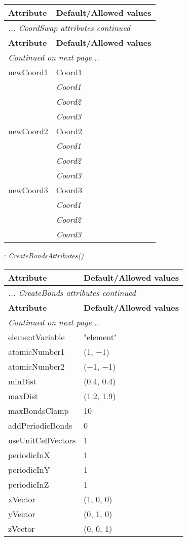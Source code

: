 \documentclass[10pt,a4paper]{report}
\begin{document}
\begin{longtable}{ll}
{\bf Attribute} & {\bf Default/Allowed values} \\
\hline \hline
\endfirsthead
\multicolumn{2}{l}{{\it ... CoordSwap attributes continued}} \\
{\bf Attribute} & {\bf Default/Allowed values} \\
\hline \hline
\endhead
\hline
\multicolumn{2}{l}{{\it Continued on next page...}} \\
\endfoot
\hline
\endlastfoot

newCoord1  &  Coord1   \\
 & {\it  Coord1} \\
 & {\it  Coord2} \\
 & {\it  Coord3} \\
newCoord2  &  Coord2   \\
 & {\it  Coord1} \\
 & {\it  Coord2} \\
 & {\it  Coord3} \\
newCoord3  &  Coord3   \\
 & {\it  Coord1} \\
 & {\it  Coord2} \\
 & {\it  Coord3} \\
\end{longtable}

\newpage

{}
: {\it CreateBondsAttributes() }\\[-3mm]

\begin{longtable}{ll}
{\bf Attribute} & {\bf Default/Allowed values} \\
\hline \hline
\endfirsthead
\multicolumn{2}{l}{{\it ... CreateBonds attributes continued}} \\
{\bf Attribute} & {\bf Default/Allowed values} \\
\hline \hline
\endhead
\hline
\multicolumn{2}{l}{{\it Continued on next page...}} \\
\endfoot
\hline
\endlastfoot

elementVariable  &  "element" \\
atomicNumber1  &  (1, $-$1) \\
atomicNumber2  &  ($-$1, $-$1) \\
minDist  &  (0.4, 0.4) \\
maxDist  &  (1.2, 1.9) \\
maxBondsClamp  &  10 \\
addPeriodicBonds  &  0 \\
useUnitCellVectors  &  1 \\
periodicInX  &  1 \\
periodicInY  &  1 \\
periodicInZ  &  1 \\
xVector  &  (1, 0, 0) \\
yVector  &  (0, 1, 0) \\
zVector  &  (0, 0, 1) \\
\end{longtable}
\end{document}

